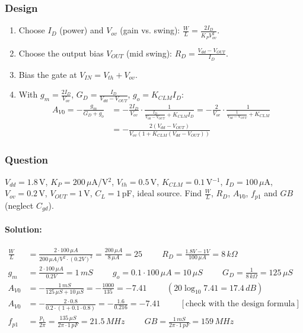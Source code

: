 \subsubsection{Design}
\begin{enumerate}
  \item Choose \(I_D\) (power) and \(V_{ov}\) (gain vs. swing):
    \(\frac{W}{L} = \frac{2 I_D}{K_P V_{ov}^2}\).
  \item Choose the output bias \(V_{OUT}\) (mid swing):
    \(R_D = \frac{V_{dd} - V_{OUT}}{I_D}\).
  \item Bias the gate at \(V_{IN} = V_{th} + V_{ov}\).
  \item With \(g_m = \frac{2 I_D}{V_{ov}}\), \(G_D = \frac{I_D}{V_{dd} - V_{OUT}}\), \(g_o = K_{CLM} I_D\):
    \begin{align*}
      A_{V0} = -\frac{g_m}{G_D + g_o} &= -\frac{2 I_D}{V_{ov}} \cdot \frac{1}{\frac{I_D}{V_{dd} - V_{OUT}} + K_{CLM} I_D}
              = -\frac{2}{V_{ov}} \cdot \frac{1}{\frac{1}{V_{dd} - V_{OUT}} + K_{CLM}} \\
             &= -\frac{2 (V_{dd} - V_{OUT})}{V_{ov}\left(1 + K_{CLM}(V_{dd} - V_{OUT})\right)}
    \end{align*}
\end{enumerate}

\subsubsection{Question}
\(V_{dd} = 1.8\,\)V, \(K_P = 200\,\mu\)A/V\(^2\), \(V_{th} = 0.5\,\)V,
\(K_{CLM} = 0.1\,\)V\(^{-1}\), \(I_D = 100\,\mu\)A, \(V_{ov} = 0.2\,\)V,
\(V_{OUT} = 1\,\)V, \(C_L = 1\,\)pF, ideal source. Find \(\frac{W}{L}\),
\(R_D\), \(A_{V0}\), \(f_{p1}\) and \(GB\) (neglect \(C_{gd}\)).
\paragraph{Solution:}
\begin{align*}
  \frac{W}{L} &= \frac{2 \cdot 100\,\mu A}{200\,\mu A/V^2 \cdot (0.2V)^2} = \frac{200\,\mu A}{8\,\mu A} = 25 \hspace{1cm}
  R_D = \frac{1.8V - 1V}{100\,\mu A} = 8\,k\Omega \\
  g_m &= \frac{2 \cdot 100\,\mu A}{0.2V} = 1\,mS \hspace{1cm}
  g_o = 0.1 \cdot 100\,\mu A = 10\,\mu S \hspace{1cm}
  G_D = \frac{1}{8\,k\Omega} = 125\,\mu S \\
  A_{V0} &= -\frac{1\,mS}{125\,\mu S + 10\,\mu S} = -\frac{1000}{135} = -7.41 \hspace{1cm} (20\log_{10} 7.41 = 17.4\,dB) \\
  A_{V0} &= -\frac{2 \cdot 0.8}{0.2 \cdot (1 + 0.1 \cdot 0.8)} = -\frac{1.6}{0.216} = -7.41 \hspace{1cm} [\text{check with the design formula}] \\
  f_{p1} &= \frac{p_1}{2\pi} = \frac{135\,\mu S}{2\pi \cdot 1\,pF} = 21.5\,MHz \hspace{1cm}
  GB = \frac{1\,mS}{2\pi \cdot 1\,pF} = 159\,MHz
\end{align*}

